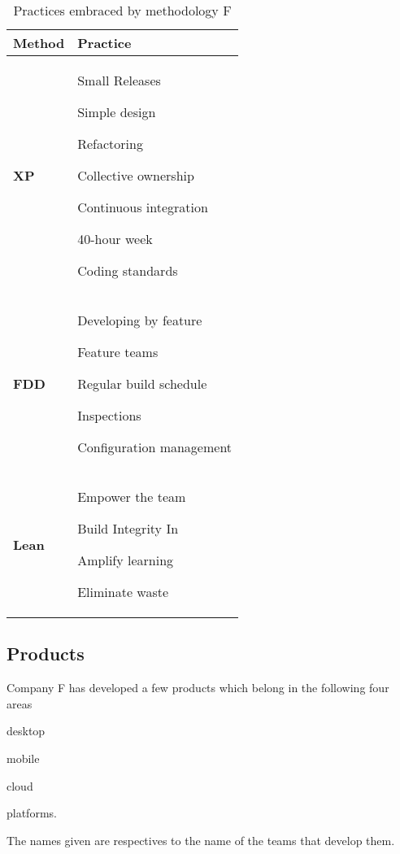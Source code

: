 \begin{table} [H]
\caption{Practices embraced by methodology F}
\begin{tabular}{| p{2cm} | p{13cm}|}
    \hline
     \textbf{Method} & \textbf{Practice} \\ \hline
     \textbf{XP}  & \begin{inparaenum} [a\upshape)]
     				\item Small Releases \item Simple design \item Refactoring \item Collective ownership \item Continuous integration \item 40-hour week \item Coding standards
					\end{inparaenum}      \\ \hline
     \textbf{FDD}  & \begin{inparaenum} [a\upshape)]  \item Developing by feature \item Feature teams \item Regular build schedule \item Inspections \item Configuration management
     				  \end{inparaenum}\\ \hline
     \textbf{Lean} & \begin{inparaenum} [a\upshape)] \item Empower the team \item Build Integrity In \item Amplify learning \item Eliminate waste
     				 \end{inparaenum} \\ \hline
\end{tabular}
\label{table:methodologyF_practices}
\end{table}

\subsection{Products}
Company F has developed a few products which belong in the following four areas 
\begin{inparaenum} [a\upshape)]
\item desktop
\item mobile
\item cloud
\item platforms.
\end{inparaenum}
The names given are respectives to the name of the teams that develop them.


